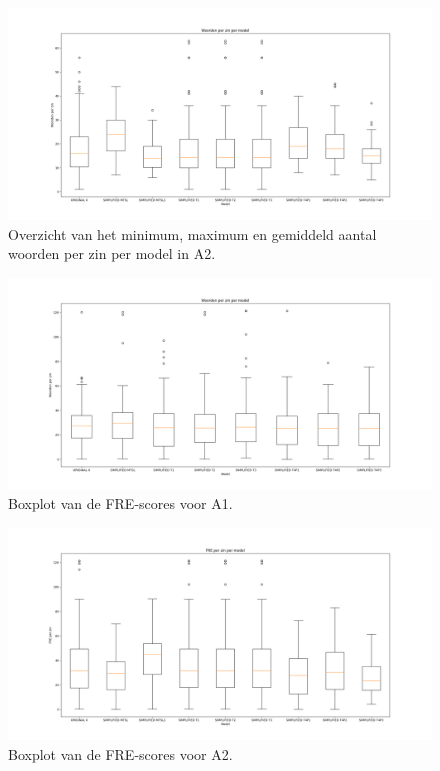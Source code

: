\begin{figure}
	\includegraphics[width=\linewidth]{img/boxplot-avg-a2.png}
	\caption{Overzicht van het minimum, maximum en gemiddeld aantal woorden per zin per model in A2.}
	\label{img:boxplot-min-max-avg-words-a2}
\end{figure}


\begin{figure}
	\includegraphics[width=\linewidth]{img/boxplot-fre-a1.png}
	\caption{Boxplot van de FRE-scores voor A1.}
	\label{img:boxplot-fre-a1}
\end{figure}

\begin{figure}
	\includegraphics[width=\linewidth]{img/boxplot-fre-a2.png}
	\caption{Boxplot van de FRE-scores voor A2.}
	\label{img:boxplot-fre-a2}
\end{figure}

